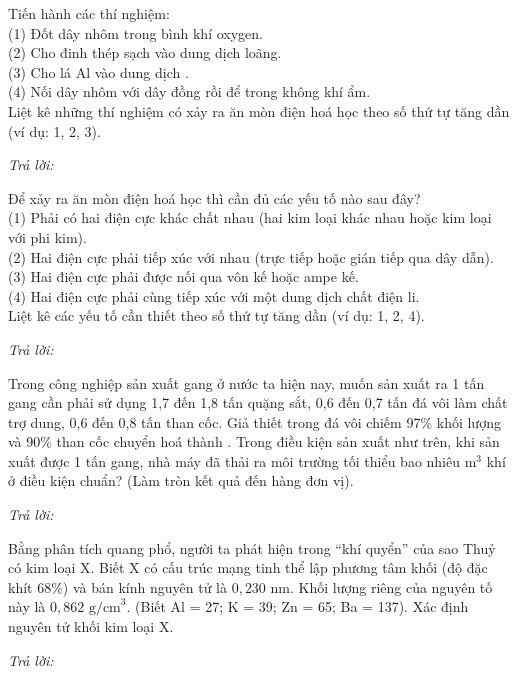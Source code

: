 \documentclass[11pt,a4paper]{article}
\def\loigiai#1{}
\begin{document}
\begin{ex}
Tiến hành các thí nghiệm:\\
(1) Đốt dây nhôm trong bình khí oxygen.\\
(2) Cho đinh thép sạch vào dung dịch  loãng.\\
(3) Cho lá Al vào dung dịch .\\
(4) Nối dây nhôm với dây đồng rồi để trong không khí ẩm.\\
Liệt kê những thí nghiệm có xảy ra ăn mòn điện hoá học theo số thứ tự tăng dần (ví dụ: 1, 2, 3).
\par\noindent\textit{Trả lời:} \dotfill
\loigiai{}
\end{ex}

\begin{ex}
Để xảy ra ăn mòn điện hoá học thì cần đủ các yếu tố nào sau đây?\\
(1) Phải có hai điện cực khác chất nhau (hai kim loại khác nhau hoặc kim loại với phi kim).\\
(2) Hai điện cực phải tiếp xúc với nhau (trực tiếp hoặc gián tiếp qua dây dẫn).\\
(3) Hai điện cực phải được nối qua vôn kế hoặc ampe kế.\\
(4) Hai điện cực phải cùng tiếp xúc với một dung dịch chất điện li.\\
Liệt kê các yếu tố cần thiết theo số thứ tự tăng dần (ví dụ: 1, 2, 4).
\par\noindent\textit{Trả lời:} \dotfill
\loigiai{}
\end{ex}

\begin{ex}
Trong công nghiệp sản xuất gang ở nước ta hiện nay, muốn sản xuất ra 1 tấn gang cần phải sử dụng 1,7 đến 1,8 tấn quặng sắt, 0,6 đến 0,7 tấn đá vôi làm chất trợ dung, 0,6 đến 0,8 tấn than cốc. Giả thiết trong đá vôi  chiếm 97\% khối lượng và 90\% than cốc chuyển hoá thành . Trong điều kiện sản xuất như trên, khi sản xuất được 1 tấn gang, nhà máy đã thải ra môi trường tối thiểu bao nhiêu $\text{m}^3$ khí  ở điều kiện chuẩn? (Làm tròn kết quả đến hàng đơn vị).
\par\noindent\textit{Trả lời:} \dotfill
\loigiai{}
\end{ex}

\begin{ex}
Bằng phân tích quang phổ, người ta phát hiện trong “khí quyển” của sao Thuỷ có kim loại X. Biết X có cấu trúc mạng tinh thể lập phương tâm khối (độ đặc khít 68\%) và bán kính nguyên tử là $0{,}230\text{ nm}$. Khối lượng riêng của nguyên tố này là $0{,}862\text{ g/cm}^3$. (Biết Al = 27; K = 39; Zn = 65; Ba = 137). Xác định nguyên tử khối kim loại X.
\par\noindent\textit{Trả lời:} \dotfill
\loigiai{}
\end{ex}


\end{document}
